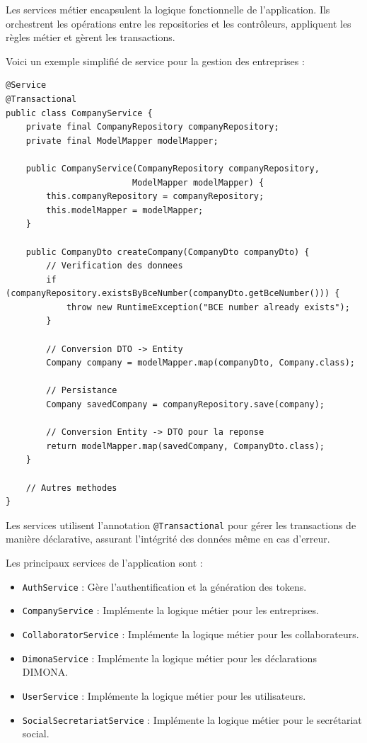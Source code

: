\documentclass[12pt,a4paper]{report}
\begin{document}
Les services métier encapsulent la logique fonctionnelle de l'application. Ils orchestrent les opérations entre les repositories et les contrôleurs, appliquent les règles métier et gèrent les transactions.

Voici un exemple simplifié de service pour la gestion des entreprises :

\begin{lstlisting}
@Service
@Transactional
public class CompanyService {
    private final CompanyRepository companyRepository;
    private final ModelMapper modelMapper;
    
    public CompanyService(CompanyRepository companyRepository, 
                         ModelMapper modelMapper) {
        this.companyRepository = companyRepository;
        this.modelMapper = modelMapper;
    }
    
    public CompanyDto createCompany(CompanyDto companyDto) {
        // Verification des donnees
        if (companyRepository.existsByBceNumber(companyDto.getBceNumber())) {
            throw new RuntimeException("BCE number already exists");
        }
        
        // Conversion DTO -> Entity
        Company company = modelMapper.map(companyDto, Company.class);
        
        // Persistance
        Company savedCompany = companyRepository.save(company);
        
        // Conversion Entity -> DTO pour la reponse
        return modelMapper.map(savedCompany, CompanyDto.class);
    }
    
    // Autres methodes
}
\end{lstlisting}

Les services utilisent l'annotation \texttt{@Transactional} pour gérer les transactions de manière déclarative, assurant l'intégrité des données même en cas d'erreur.

Les principaux services de l'application sont :
\begin{itemize}
  \item \texttt{AuthService} : Gère l'authentification et la génération des tokens.
  \item \texttt{CompanyService} : Implémente la logique métier pour les entreprises.
  \item \texttt{CollaboratorService} : Implémente la logique métier pour les collaborateurs.
  \item \texttt{DimonaService} : Implémente la logique métier pour les déclarations DIMONA.
  \item \texttt{UserService} : Implémente la logique métier pour les utilisateurs.
  \item \texttt{SocialSecretariatService} : Implémente la logique métier pour le secrétariat social.
\end{itemize}
\end{document}
